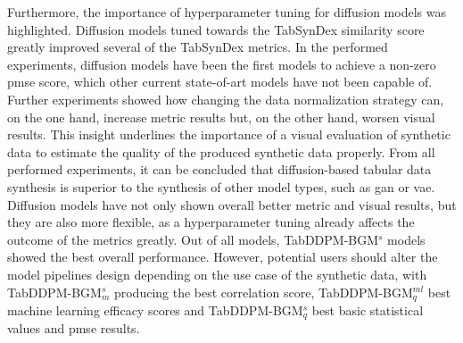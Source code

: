 Furthermore, the importance of hyperparameter tuning for diffusion models was highlighted.
Diffusion models tuned towards the TabSynDex similarity score greatly improved several of the TabSynDex metrics.
In the performed experiments, diffusion models have been the first models to achieve a non-zero \gls{pmse} score, which other current state-of-art models have not been capable of.
Further experiments showed how changing the data normalization strategy can, on the one hand, increase metric results but, on the other hand, worsen visual results.
This insight underlines the importance of a visual evaluation of synthetic data to estimate the quality of the produced synthetic data properly.
From all performed experiments, it can be concluded that diffusion-based tabular data synthesis is superior to the synthesis of other model types, such as \gls{gan} or \gls{vae}.
Diffusion models have not only shown overall better metric and visual results, but they are also more flexible, as a hyperparameter tuning already affects the outcome of the metrics greatly.
Out of all models, TabDDPM-BGM$^{s}$ models showed the best overall performance.
However, potential users should alter the model pipelines design depending on the use case of the synthetic data, with TabDDPM-BGM$^{s}_m$ producing the best correlation score, TabDDPM-BGM$^{ml}_q$ best machine learning efficacy scores and TabDDPM-BGM$^{s}_q$ best basic statistical values and \gls{pmse} results.

